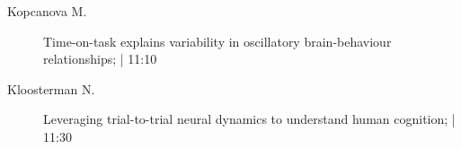 \begin{symposium}
\begin{description}
                \item [ Kopcanova M.] Time-on-task explains variability in oscillatory brain-behaviour relationships; \textcolor{mygray}{ | 11:10}    
                
                \item [ Kloosterman N.] Leveraging trial-to-trial neural dynamics to understand human cognition; \textcolor{mygray}{ | 11:30}    
                
            \end{description} 
            \end{symposium}
            